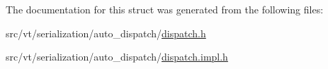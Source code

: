 The documentation for this struct was generated from the following files\+:\begin{DoxyCompactItemize}
\item 
src/vt/serialization/auto\+\_\+dispatch/\hyperlink{serialization_2auto__dispatch_2dispatch_8h}{dispatch.\+h}\item 
src/vt/serialization/auto\+\_\+dispatch/\hyperlink{serialization_2auto__dispatch_2dispatch_8impl_8h}{dispatch.\+impl.\+h}\end{DoxyCompactItemize}
